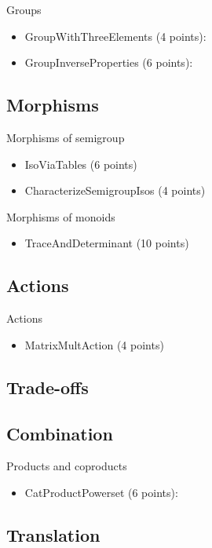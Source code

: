 Groups
\begin{itemize}
    \item GroupWithThreeElements (4 points): 
    \item GroupInverseProperties (6 points): 
\end{itemize}

\subsection{Morphisms}
Morphisms of semigroup
\begin{itemize}
    \item IsoViaTables (6 points) 
    \item CharacterizeSemigroupIsos (4 points) 
\end{itemize}

Morphisms of monoids
\begin{itemize}
    \item TraceAndDeterminant (10 points) 
\end{itemize}

\subsection{Actions}

Actions
\begin{itemize}
    \item MatrixMultAction (4 points) 
\end{itemize}

\subsection{Trade-offs}

\subsection{Combination}

Products and coproducts
\begin{itemize}
    \item CatProductPowerset (6 points): 
\end{itemize}

\subsection{Translation}

